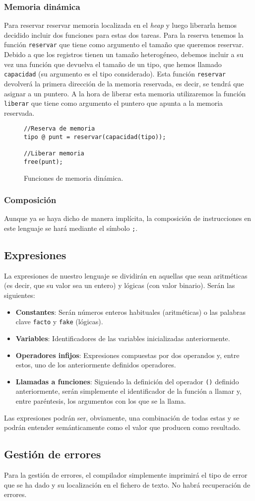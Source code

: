 \subsubsection{Memoria dinámica}
Para reservar reservar memoria localizada en el \textit{heap} y luego liberarla
hemos decidido incluir dos funciones para estas dos tareas. Para la reserva
tenemos la función \lstinline{reservar} que tiene como argumento el tamaño que
queremos reservar. Debido a que los registros tienen un tamaño heterogéneo,
debemos incluir a su vez una función que devuelva el tamaño de un tipo, que
hemos llamado \lstinline{capacidad} (su argumento es el tipo considerado). Esta
función \lstinline{reservar} devolverá la primera dirección de la memoria
reservada, es decir, se tendrá que asignar a un puntero. A la hora de liberar
esta memoria utilizaremos la función \lstinline{liberar} que tiene como
argumento el puntero que apunta a la memoria reservada.
\begin{figure}[htbp]
    \centering
    \begin{lstlisting}
//Reserva de memoria
tipo @ punt = reservar(capacidad(tipo));

//Liberar memoria
free(punt);
    \end{lstlisting}
    \caption{Funciones de memoria dinámica.}
\end{figure}

\subsubsection{Composición}
Aunque ya se haya dicho de manera implícita, la composición de instrucciones en
este lenguaje se hará mediante el símbolo \lstinline{;}.

\subsection{Expresiones}
La expresiones de nuestro lenguaje se dividirán en aquellas que sean aritméticas
(es decir, que su valor sea un entero) y lógicas (con valor binario). Serán las
siguientes:
\begin{itemize}
    \item \textbf{Constantes}: Serán números enteros habituales (aritméticas) o
        las palabras clave \lstinline{facto} y \lstinline{fake} (lógicas).
    \item \textbf{Variables}: Identificadores de las variables inicializadas
        anteriormente.
    \item \textbf{Operadores infijos}: Expresiones compuestas por dos operandos
        y, entre estos, uno de los anteriormente definidos operadores.
    \item \textbf{Llamadas a funciones}: Siguiendo la definición del operador
        \lstinline{()} definido anteriormente, serán simplemente el
        identificador de la función a llamar y, entre paréntesis, los argumentos
        con los que se la llama.
\end{itemize}
Las expresiones podrán ser, obviamente, una combinación de todas estas y se
podrán entender semánticamente como el valor que producen como resultado.

\subsection{Gestión de errores}
Para la gestión de errores, el compilador simplemente imprimirá el tipo de error
que se ha dado y su localización en el fichero de texto. No habrá recuperación
de errores.
